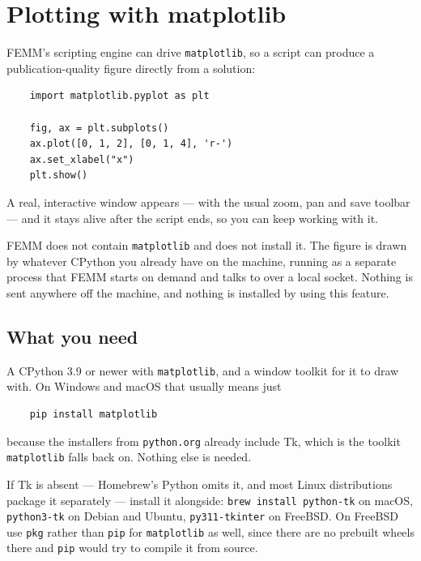 %
%

\chapter{Plotting with matplotlib}
\label{pybridge}

FEMM's scripting engine can drive {\tt matplotlib}, so a script can produce
a publication-quality figure directly from a solution:

\begin{verbatim}
    import matplotlib.pyplot as plt

    fig, ax = plt.subplots()
    ax.plot([0, 1, 2], [0, 1, 4], 'r-')
    ax.set_xlabel("x")
    plt.show()
\end{verbatim}

A real, interactive window appears --- with the usual zoom, pan and save
toolbar --- and it stays alive after the script ends, so you can keep working
with it.

FEMM does not contain {\tt matplotlib} and does not install it.  The figure is
drawn by whatever CPython you already have on the machine, running as a
separate process that FEMM starts on demand and talks to over a local socket.
Nothing is sent anywhere off the machine, and nothing is installed by using
this feature.

\section{What you need}

A CPython 3.9 or newer with {\tt matplotlib}, and a window toolkit for it to
draw with.  On Windows and macOS that usually means just

\begin{verbatim}
    pip install matplotlib
\end{verbatim}

\noindent because the installers from {\tt python.org} already include Tk,
which is the toolkit {\tt matplotlib} falls back on.  Nothing else is needed.

If Tk is absent --- Homebrew's Python omits it, and most Linux distributions
package it separately --- install it alongside: {\tt brew install python-tk} on
macOS, {\tt python3-tk} on Debian and Ubuntu, {\tt py311-tkinter} on FreeBSD.
On FreeBSD use {\tt pkg} rather than {\tt pip} for {\tt matplotlib} as well,
since there are no prebuilt wheels there and {\tt pip} would try to compile it
from source.

